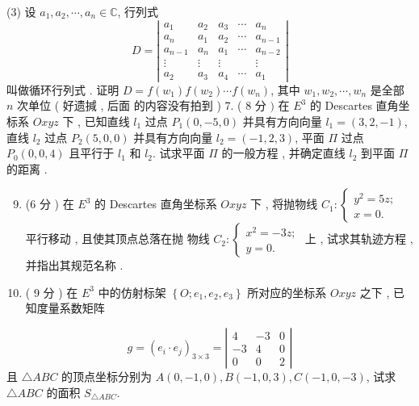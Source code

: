 \documentclass[10pt]{article}
\begin{document}
{(3)  设  $a_{1}, a_{2}, \cdots, a_{n} \in \mathbb{C}$,  行列式 
$$
D=\left|\begin{array}{ccccc}
a_{1} & a_{2} & a_{3} & \cdots & a_{n} \\
a_{n} & a_{1} & a_{2} & \cdots & a_{n-1} \\
a_{n-1} & a_{n} & a_{1} & \cdots & a_{n-2} \\
\vdots & \vdots & \vdots & & \vdots \\
a_{2} & a_{3} & a_{4} & \cdots & a_{1}
\end{array}\right|
$$
 叫做循环行列式 .  证明  $D=f\left(w_{1}\right) f\left(w_{2}\right) \cdots f\left(w_{n}\right)$,  其中  $w_{1}, w_{2}, \cdots, w_{n}$  是全部  $n$  次单位  ( 好遗㨔 ,  后面   的内容没有拍到 ) 7. ( 8  分  $)$  在  $E^{3}$  的  Descartes  直角坐标系  $O x y z$  下 ,  已知直线  $l_{1}$  过点  $P_{1}(0,-5,0)$  并具有方向向量  $l_{1}=(3,2,-1)$,  直线  $l_{2}$  过点  $P_{2}(5,0,0)$  并具有方向向量  $l_{2}=(-1,2,3)$,  平面  $\Pi$  过点  $P_{0}(0,0,4)$  且平行于  $l_{1}$  和  $l_{2}$.  试求平面  $\Pi$  的一般方程 ,  并确定直线  $l_{2}$  到平面  $\Pi$  的距离 .

\begin{enumerate}
  \setcounter{enumi}{8}
  \item (6  分 )  在  $E^{3}$  的  Descartes  直角坐标系  $O x y z$  下 ,  将抛物线  $C_{1}:\left\{\begin{array}{l}y^{2}=5 z ; \\ x=0 .\end{array}\right.$  平行移动 ,  且使其顶点总落在抛   物线  $C_{2}:\left\{\begin{array}{l}x^{2}=-3 z ; \\ y=0 .\end{array}\right.$  上 ,  试求其轨迹方程 ,  并指出其规范名称 .

  \item ( 9  分 )  在  $E^{3}$  中的仿射标架  $\left\{O ; e_{1}, e_{2}, e_{3}\right\}$  所对应的坐标系  $O x y z$  之下 ,  已知度量系数矩阵 

\end{enumerate}
$$
g=\left(e_{i} \cdot e_{j}\right)_{3 \times 3}=\left|\begin{array}{ccc}
4 & -3 & 0 \\
-3 & 4 & 0 \\
0 & 0 & 2
\end{array}\right|
$$
 且  $\triangle A B C$  的顶点坐标分别为  $A(0,-1,0), B(-1,0,3), C(-1,0,-3)$,  试求  $\triangle A B C$  的面积  $S_{\triangle A B C}$.

}
\end{document}
